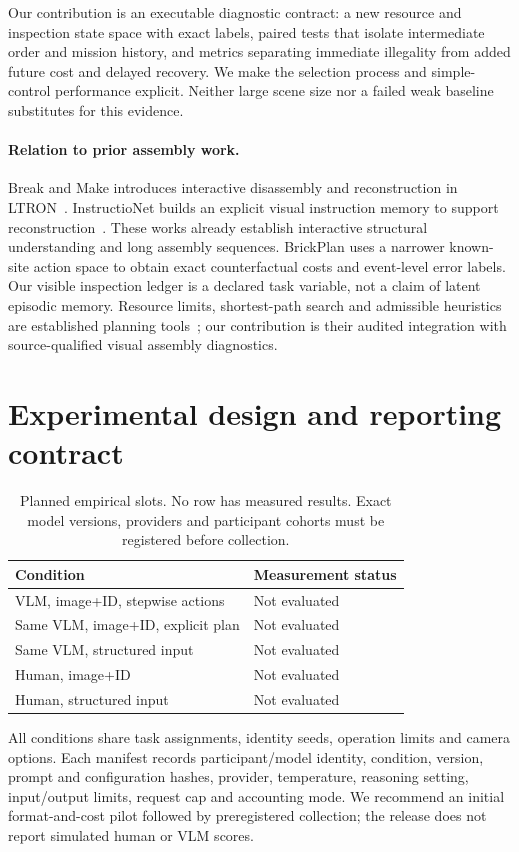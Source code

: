 \documentclass[10pt,twocolumn]{article}
\begin{document}
Our contribution is an executable diagnostic contract: a new resource and
inspection state space with exact labels, paired tests that isolate
intermediate order and mission history, and metrics separating immediate
illegality from added future cost and delayed recovery. We make the
selection process and simple-control performance explicit. Neither large
scene size nor a failed weak baseline substitutes for this evidence.

\paragraph{Relation to prior assembly work.}
Break and Make introduces interactive disassembly and reconstruction in
LTRON~\cite{ltron}. InstructioNet builds an explicit visual instruction memory
to support reconstruction~\cite{instructionet}. These works already establish
interactive structural understanding and long assembly sequences.
BrickPlan uses a narrower known-site action space to obtain exact
counterfactual costs and event-level error labels. Our visible inspection
ledger is a declared task variable, not a claim of latent episodic memory.
Resource limits, shortest-path search and admissible heuristics are
established planning tools~\cite{astar}; our contribution is their audited
integration with source-qualified visual assembly diagnostics.

\section{Experimental design and reporting contract}
\label{sec:design}
\begin{table}[t]
\centering\small
\caption{Planned empirical slots. No row has measured results. Exact
model versions, providers and participant cohorts must be registered
before collection.}
\begin{tabular}{p{}p{}}\toprule
Condition & Measurement status\\\midrule
VLM, image+ID, stepwise actions & Not evaluated\\
Same VLM, image+ID, explicit plan & Not evaluated\\
Same VLM, structured input & Not evaluated\\
Human, image+ID & Not evaluated\\
Human, structured input & Not evaluated\\\bottomrule
\end{tabular}
\end{table}
All conditions share task assignments, identity seeds, operation limits and
camera options. Each manifest records participant/model identity, condition,
version, prompt and configuration hashes, provider, temperature, reasoning
setting, input/output limits, request cap and accounting mode.
We recommend an initial format-and-cost pilot followed by preregistered
collection; the release does not report simulated human or VLM scores.
\end{document}
